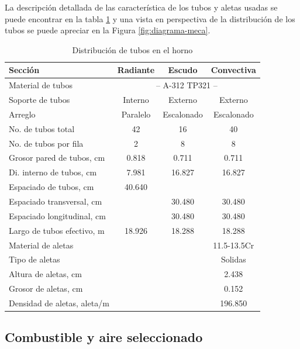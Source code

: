 \par La descripción detallada de las característica de los tubos y aletas usadas se puede encontrar en la tabla \ref{tbl:tubes} y una vista en perspectiva de la distribución de los tubos se puede apreciar en la Figura \ref{fig:diagrama-meca}.

\begin{table}
\begin{center}
\caption[Distribución de tubos en el horno]{Distribución de tubos en el horno}
\label{tbl:tubes}
\begin{tabular}{l|c|c|c}
Sección 					& Radiante			& Escudo			& Convectiva \\
\hline
Material de tubos			& \multicolumn{3}{c}{-- A-312 TP321 --} \\
Soporte de tubos    		& Interno			& Externo			& Externo		\\
Arreglo			    		& Paralelo			& Escalonado		& Escalonado	\\
No. de tubos total    		& 42				& 16				& 40			\\
No. de tubos por fila		& 2					& 8					& 8				\\
Grosor pared de tubos, cm	& 0.818				& 0.711				& 0.711			\\
Di. interno de tubos, cm	& 7.981				& 16.827			& 16.827		\\
Espaciado de tubos, cm  	& 40.640			& 					& 				\\
Espaciado transversal, cm  	&					& 30.480			& 30.480		\\
Espaciado longitudinal, cm 	&					& 30.480			& 30.480		\\
Largo de tubos efectivo, m	& 18.926			& 18.288			& 18.288		\\
\hline
Material de aletas			&					& 					& 11.5-13.5Cr	\\
Tipo de aletas				&					& 					& Solidas		\\	
Altura de aletas, cm		&					& 					& 2.438			\\
Grosor de aletas, cm		&					& 					& 0.152			\\
Densidad de aletas, aleta/m	& 					& 					& 196.850		\\
\end{tabular}
\end{center}
\end{table}

\subsection{Combustible y aire seleccionado}

